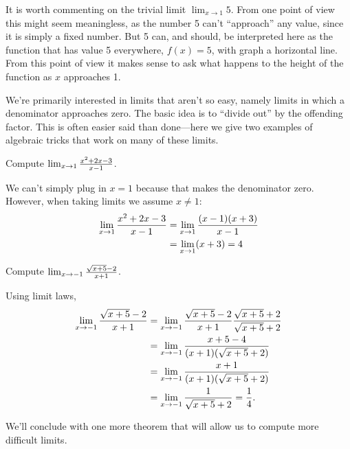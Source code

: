 It is worth commenting on the trivial limit $\lim_{x\to1}5$. From one
point of view this might seem meaningless, as the number 5 can't
``approach'' any value, since it is simply a fixed number. But 5 can,
and should, be interpreted here as the function that has value 5
everywhere, $f(x)=5$, with graph a horizontal line. From this point of
view it makes sense to ask what happens to the height of the function
as $x$ approaches 1.

We're primarily interested in limits that aren't so easy, namely
limits in which a denominator approaches zero. The basic idea is to
``divide out'' by the offending factor. This is often easier said than
done---here we give two examples of algebraic tricks that work on many
of these limits.


\begin{example}
Compute $\lim_{x\to1}{x^2+2x-3\over x-1}$. 
\end{example}
\begin{solution}
We can't simply plug in $x=1$ because that makes the denominator zero.
However, when taking limits we assume $x\ne 1$:
\begin{align*}
\lim_{x\to1}{x^2+2x-3\over x-1}&=\lim_{x\to1}{(x-1)(x+3)\over x-1} \\
&=\lim_{x\to1}(x+3)=4
\end{align*}
\end{solution}

\begin{example}
Compute $\lim_{x\to-1} {\sqrt{x+5}-2\over x+1}$.
\end{example}
\begin{solution} 
Using limit laws,
\begin{align*}
\lim_{x\to-1} {\sqrt{x+5}-2\over x+1}&=
\lim_{x\to-1} {\sqrt{x+5}-2\over x+1}{\sqrt{x+5}+2\over \sqrt{x+5}+2} \\
&=\lim_{x\to-1} {x+5-4\over (x+1)(\sqrt{x+5}+2)} \\
&=\lim_{x\to-1} {x+1\over (x+1)(\sqrt{x+5}+2)} \\
&=\lim_{x\to-1} {1\over \sqrt{x+5}+2}={1\over4}.
\end{align*}
\end{solution}


We'll conclude with one more theorem that will allow us to compute
more difficult limits.

